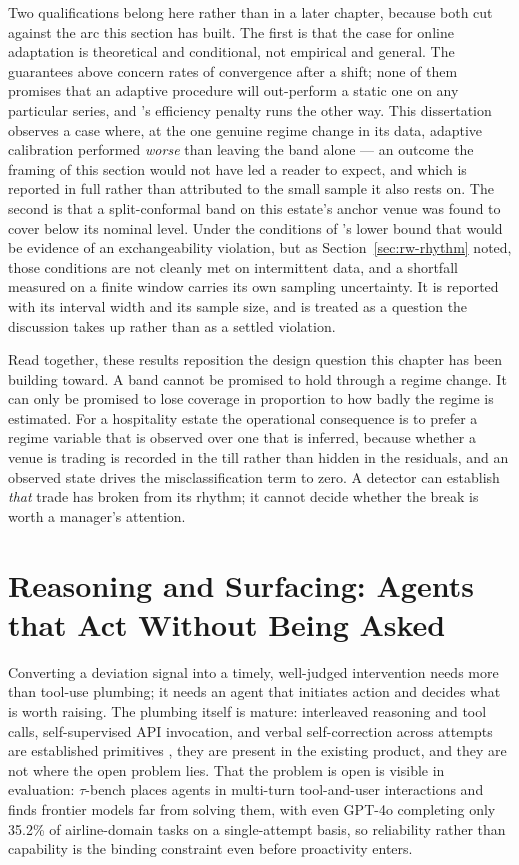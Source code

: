 Two qualifications belong here rather than in a later chapter, because both cut
against the arc this section has built. The first is that the case for online
adaptation is theoretical and conditional, not empirical and general. The
guarantees above concern rates of convergence after a shift; none of them
promises that an adaptive procedure will out-perform a static one on any
particular series, and \citet{zaffran_adaptive_2022}'s efficiency penalty runs
the other way. This dissertation observes a case where, at the one genuine
regime change in its data, adaptive calibration performed \emph{worse} than
leaving the band alone --- an outcome the framing of this section would not
have led a reader to expect, and which is reported in full rather than
attributed to the small sample it also rests on. The second is that a
split-conformal band on this estate's anchor venue was found to cover below its
nominal level. Under the conditions of \citet{angelopoulos_conformal_2023}'s
lower bound that would be evidence of an exchangeability violation, but as
Section~\ref{sec:rw-rhythm} noted, those conditions are not cleanly met on
intermittent data, and a shortfall measured on a finite window carries its own
sampling uncertainty. It is reported with its interval width and its sample
size, and is treated as a question the discussion takes up rather than as a
settled violation.

Read together, these results reposition the design question this chapter has
been building toward. A band cannot be promised to hold through a regime
change. It can only be promised to lose coverage in proportion to how badly
the regime is estimated. For a hospitality estate the operational consequence
is to prefer a regime variable that is observed over one that is inferred,
because whether a venue is trading is recorded in the till rather than hidden
in the residuals, and an observed state drives the misclassification term to
zero. A detector can establish \emph{that} trade has broken from its rhythm;
it cannot decide whether the break is worth a manager's attention.

\section{Reasoning and Surfacing: Agents that Act Without Being Asked}
\label{sec:rw-surfacing}

Converting a deviation signal into a timely, well-judged intervention needs
more than tool-use plumbing; it needs an agent that initiates action and
decides what is worth raising. The plumbing itself is mature: interleaved
reasoning and tool calls, self-supervised API invocation, and verbal
self-correction across attempts are established primitives
\citep{yao_react_2022,schick_toolformer_2023,shinn_reflexion_2023}, they are
present in the existing product, and they are not where the open problem lies.
That the problem is open is visible in evaluation: $\tau$-bench
\citep[a 2024 preprint]{yao_-bench_2024} places agents in multi-turn
tool-and-user interactions and finds frontier models far from solving them,
with even GPT-4o completing only 35.2\% of airline-domain tasks on a
single-attempt basis, so reliability rather than capability is the binding
constraint even before proactivity enters.

